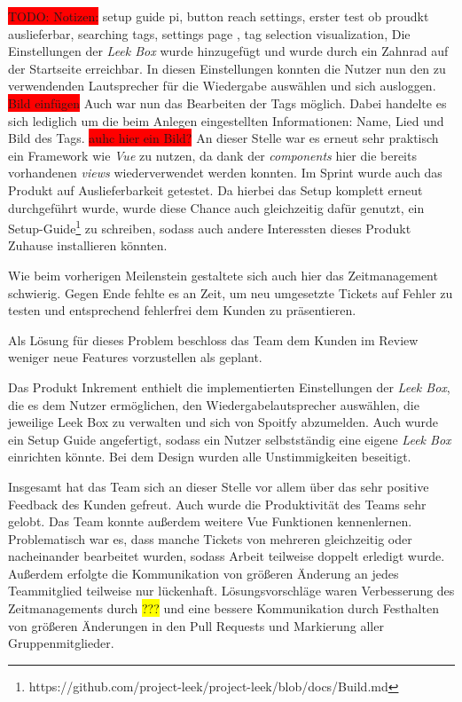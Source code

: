 \documentclass[10pt, a4paper]{article}
\begin{document}
\colorbox{red}{TODO: Notizen:} setup guide pi, button reach settings, erster test ob proudkt auslieferbar, searching tags, settings page , tag selection visualization,
Die Einstellungen der \textit{Leek Box} wurde hinzugefügt und wurde durch ein Zahnrad auf der Startseite erreichbar.
In diesen Einstellungen konnten die Nutzer nun den zu verwendenden Lautsprecher für die Wiedergabe auswählen und sich ausloggen.
\colorbox{red}{Bild einfügen}
Auch war nun das Bearbeiten der Tags möglich.
Dabei handelte es sich lediglich um die beim Anlegen eingestellten Informationen: Name, Lied und Bild des Tags.
\colorbox{red}{auhc hier ein Bild?}
An dieser Stelle war es erneut sehr praktisch ein Framework wie \textit{Vue} zu nutzen, da dank der \textit{components} hier die bereits vorhandenen \textit{views} wiederverwendet werden konnten.
Im Sprint wurde auch das Produkt auf Auslieferbarkeit getestet.
Da hierbei das Setup komplett erneut durchgeführt wurde, wurde diese Chance auch gleichzeitig dafür genutzt, ein Setup-Guide\footnote{https://github.com/project-leek/project-leek/blob/docs/Build.md} zu schreiben, sodass auch andere Interessten dieses Produkt Zuhause installieren könnten.

Wie beim vorherigen Meilenstein gestaltete sich auch hier das Zeitmanagement schwierig.
Gegen Ende fehlte es an Zeit, um neu umgesetzte Tickets auf Fehler zu testen und entsprechend fehlerfrei dem Kunden zu präsentieren.

Als Lösung für dieses Problem beschloss das Team dem Kunden im Review weniger neue Features vorzustellen als geplant.

Das Produkt Inkrement enthielt die implementierten Einstellungen der \textit{Leek Box}, die es dem Nutzer ermöglichen, den Wiedergabelautsprecher auswählen, die jeweilige Leek Box zu verwalten und sich von Spoitfy abzumelden.
Auch wurde ein Setup Guide angefertigt, sodass ein Nutzer selbstständig eine eigene \textit{Leek Box} einrichten könnte.
Bei dem Design wurden alle Unstimmigkeiten beseitigt.

Insgesamt hat das Team sich an dieser Stelle vor allem über das sehr positive Feedback des Kunden gefreut.
Auch wurde die Produktivität des Teams sehr gelobt.
Das Team konnte außerdem weitere Vue Funktionen kennenlernen.
Problematisch war es, dass manche Tickets von mehreren gleichzeitig oder nacheinander bearbeitet wurden, sodass Arbeit teilweise doppelt erledigt wurde.
Außerdem erfolgte die Kommunikation von größeren Änderung an jedes Teammitglied teilweise nur lückenhaft.
Lösungsvorschläge waren Verbesserung des Zeitmanagements durch \colorbox{yellow}{???} und eine bessere Kommunikation durch Festhalten von größeren Änderungen in den Pull Requests und Markierung aller Gruppenmitglieder.
\end{document}
